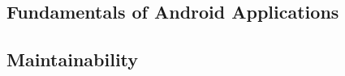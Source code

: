 %

%

\subsection{Fundamentals of Android Applications}


%

%

%

%

%

\subsection{Maintainability}


